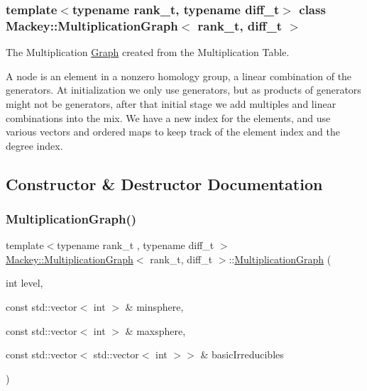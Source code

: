 \subsubsection*{template$<$typename rank\+\_\+t, typename diff\+\_\+t$>$\newline
class Mackey\+::\+Multiplication\+Graph$<$ rank\+\_\+t, diff\+\_\+t $>$}

The Multiplication \hyperlink{classMackey_1_1Graph}{Graph} created from the Multiplication Table. 

A node is an element in a nonzero homology group, a linear combination of the generators. At initialization we only use generators, but as products of generators might not be generators, after that initial stage we add multiples and linear combinations into the mix. We have a new index for the elements, and use various vectors and ordered maps to keep track of the element index and the degree index. 

\subsection{Constructor \& Destructor Documentation}
\mbox{\label{classMackey_1_1MultiplicationGraph_a3f974791242d9e13ddca520df4265aca}} 
\subsubsection{\texorpdfstring{Multiplication\+Graph()}{MultiplicationGraph()}\hspace{0.1cm}{\footnotesize\ttfamily [1/2]}}
{\footnotesize\ttfamily template$<$typename rank\+\_\+t , typename diff\+\_\+t $>$ \\
\hyperlink{classMackey_1_1MultiplicationGraph}{Mackey\+::\+Multiplication\+Graph}$<$ rank\+\_\+t, diff\+\_\+t $>$\+::\hyperlink{classMackey_1_1MultiplicationGraph}{Multiplication\+Graph} (\begin{DoxyParamCaption}\item[{int}]{level,  }\item[{const std\+::vector$<$ int $>$ \&}]{minsphere,  }\item[{const std\+::vector$<$ int $>$ \&}]{maxsphere,  }\item[{const std\+::vector$<$ std\+::vector$<$ int $>$$>$ \&}]{basic\+Irreducibles }\end{DoxyParamCaption})\hspace{0.3cm}{\ttfamily [protected]}}



